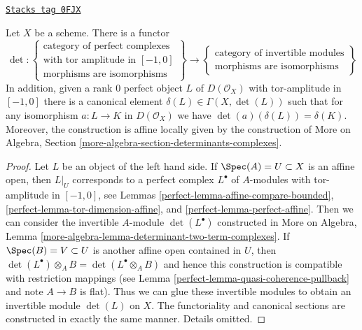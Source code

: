 \begin{lemma}
\label{perfect-lemma-determinant-two-term-complexes}
\href{https://stacks.math.columbia.edu/tag/0FJX}{\texttt{Stacks tag 0FJX}}

Let $X$ be a scheme. There is a functor
$$
\det :
\left\{
\begin{matrix}
\text{category of perfect complexes} \\
\text{with tor amplitude in }[-1, 0] \\
\text{morphisms are isomorphisms}
\end{matrix}
\right\}
\longrightarrow
\left\{
\begin{matrix}
\text{category of invertible modules} \\
\text{morphisms are isomorphisms}
\end{matrix}
\right\}
$$
In addition, given a rank $0$ perfect object $L$ of $D(\mathcal{O}_X)$ with
tor-amplitude in $[-1, 0]$ there is a canonical element
$\delta(L) \in \Gamma(X, \det(L))$ such that for any isomorphism
$a : L \to K$ in $D(\mathcal{O}_X)$ we have $\det(a)(\delta(L)) = \delta(K)$.
Moreover, the construction is affine locally given by the construction
of More on Algebra, Section \ref{more-algebra-section-determinants-complexes}.
\end{lemma}

\begin{proof}

Let $L$ be an object of the left hand side. If $\Spec(A) = U \subset X$
is an affine open, then $L|_U$ corresponds to a perfect complex $L^\bullet$
of $A$-modules with tor-amplitude in $[-1, 0]$, see
Lemmas \ref{perfect-lemma-affine-compare-bounded},
\ref{perfect-lemma-tor-dimension-affine}, and
\ref{perfect-lemma-perfect-affine}.
Then we can consider the invertible $A$-module $\det(L^\bullet)$ constructed in
More on Algebra, Lemma \ref{more-algebra-lemma-determinant-two-term-complexes}.
If $\Spec(B) = V \subset U$ is another affine open contained in $U$,
then $\det(L^\bullet) \otimes_A B = \det(L^\bullet \otimes_A B)$
and hence this construction is compatible with restriction mappings
(see Lemma \ref{perfect-lemma-quasi-coherence-pullback} and note $A \to B$ is flat).
Thus we can glue these invertible modules to obtain an invertible module
$\det(L)$ on $X$. The functoriality and canonical sections
are constructed in exactly the same manner. Details omitted.
\end{proof}

